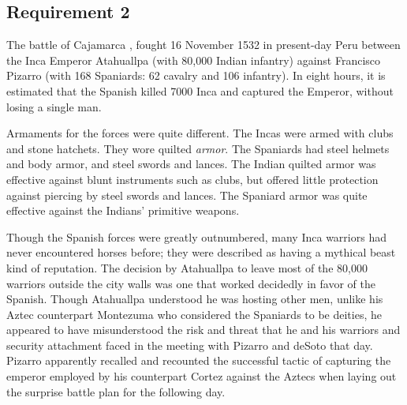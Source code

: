 \documentclass[letterpaper,10pt]{article}
\begin{document}
\subsection{Requirement 2}
The battle of Cajamarca , fought 16 November 1532 in present-day Peru between the Inca Emperor Atahuallpa (with 80,000 Indian infantry) against Francisco Pizarro (with 168 Spaniards:  62 cavalry and 106 infantry).  In eight hours, it is estimated that the Spanish killed 7000 Inca and captured the Emperor, without losing a single man.

Armaments for the forces were quite different.  The Incas were armed with clubs and stone hatchets.  They wore quilted \emph{armor}.  The Spaniards had steel helmets and body armor, and steel swords and lances.  The Indian quilted armor was effective against blunt instruments such as clubs, but offered little protection against piercing by steel swords and lances.  The Spaniard armor was quite effective against the Indians' primitive weapons.

Though the Spanish forces were greatly outnumbered, many Inca warriors had never encountered horses before; they were described as having a mythical beast kind of reputation.  The decision by Atahuallpa to leave most of the 80,000 warriors outside the city walls was one that worked decidedly in favor of the Spanish.  Though Atahuallpa understood he was hosting other men, unlike his Aztec counterpart Montezuma who considered the Spaniards to be deities, he appeared to have misunderstood the risk and threat that he and his warriors and security attachment faced in the meeting with Pizarro and deSoto that day.  Pizarro apparently recalled and recounted the successful tactic of capturing the emperor employed by his counterpart Cortez against the Aztecs when laying out the surprise battle plan for the following day.
\end{document}
